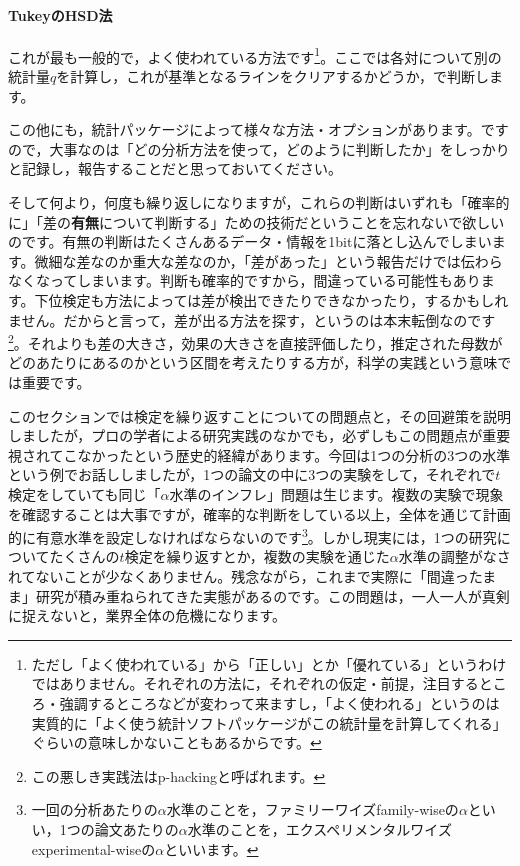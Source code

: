 \documentclass{ltjsarticle}
\begin{document}
\paragraph{TukeyのHSD法}これが最も一般的で，よく使われている方法です\footnote{ただし「よく使われている」から「正しい」とか「優れている」というわけではありません。それぞれの方法に，それぞれの仮定・前提，注目するところ・強調するところなどが変わって来ますし，「よく使われる」というのは実質的に「よく使う統計ソフトパッケージがこの統計量を計算してくれる」ぐらいの意味しかないこともあるからです。}。ここでは各対について別の統計量$q$を計算し，これが基準となるラインをクリアするかどうか，で判断します。

この他にも，統計パッケージによって様々な方法・オプションがあります。ですので，大事なのは「どの分析方法を使って，どのように判断したか」をしっかりと記録し，報告することだと思っておいてください。

そして何より，何度も繰り返しになりますが，これらの判断はいずれも「確率的に」「差の\textbf{有無}について判断する」ための技術だということを忘れないで欲しいのです。有無の判断はたくさんあるデータ・情報を1bitに落とし込んでしまいます。微細な差なのか重大な差なのか，「差があった」という報告だけでは伝わらなくなってしまいます。判断も確率的ですから，間違っている可能性もあります。下位検定も方法によっては差が検出できたりできなかったり，するかもしれません。だからと言って，差が出る方法を探す，というのは本末転倒なのです\footnote{この悪しき実践法はp-hackingと呼ばれます。}。それよりも差の大きさ，効果の大きさを直接評価したり，推定された母数がどのあたりにあるのかという区間を考えたりする方が，科学の実践という意味では重要です。

このセクションでは検定を繰り返すことについての問題点と，その回避策を説明しましたが，プロの学者による研究実践のなかでも，必ずしもこの問題点が重要視されてこなかったという歴史的経緯があります。今回は1つの分析の3つの水準という例でお話ししましたが，1つの論文の中に3つの実験をして，それぞれで$t$検定をしていても同じ「$\alpha$水準のインフレ」問題は生じます。複数の実験で現象を確認することは大事ですが，確率的な判断をしている以上，全体を通じて計画的に有意水準を設定しなければならないのです\footnote{一回の分析あたりの$\alpha$水準のことを，ファミリーワイズfamily-wiseの$\alpha$といい，1つの論文あたりの$\alpha$水準のことを，エクスペリメンタルワイズexperimental-wiseの$\alpha$といいます。}。しかし現実には，1つの研究についてたくさんの$t$検定を繰り返すとか，複数の実験を通じた$\alpha$水準の調整がなされてないことが少なくありません。残念ながら，これまで実際に「間違ったまま」研究が積み重ねられてきた実態があるのです。この問題は，一人一人が真剣に捉えないと，業界全体の危機になります。
\end{document}
